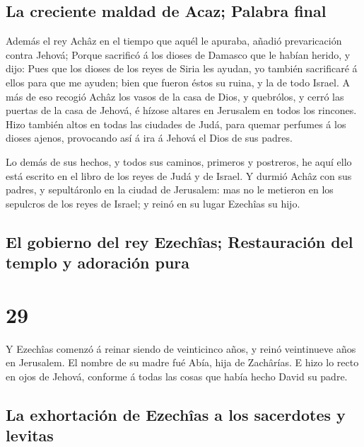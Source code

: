 \hypertarget{la-creciente-maldad-de-acaz-palabra-final}{%
\subsection{La creciente maldad de Acaz; Palabra
final}\label{la-creciente-maldad-de-acaz-palabra-final}}

 Además el rey Achâz en el tiempo que aquél le apuraba,
añadió prevaricación contra Jehová;  Porque sacrificó á los
dioses de Damasco que le habían herido, y dijo: Pues que los dioses de
los reyes de Siria les ayudan, yo también sacrificaré á ellos para que
me ayuden; bien que fueron éstos su ruina, y la de todo Israel.
 A más de eso recogió Achâz los vasos de la casa de Dios, y
quebrólos, y cerró las puertas de la casa de Jehová, é hízose altares en
Jerusalem en todos los rincones.  Hizo también altos en
todas las ciudades de Judá, para quemar perfumes á los dioses ajenos,
provocando así á ira á Jehová el Dios de sus padres.

 Lo demás de sus hechos, y todos sus caminos, primeros y
postreros, he aquí ello está escrito en el libro de los reyes de Judá y
de Israel.  Y durmió Achâz con sus padres, y sepultáronlo
en la ciudad de Jerusalem: mas no le metieron en los sepulcros de los
reyes de Israel; y reinó en su lugar Ezechîas su hijo.

\hypertarget{el-gobierno-del-rey-ezechuxeeas-restauraciuxf3n-del-templo-y-adoraciuxf3n-pura}{%
\subsection{El gobierno del rey Ezechîas; Restauración del templo y
adoración
pura}\label{el-gobierno-del-rey-ezechuxeeas-restauraciuxf3n-del-templo-y-adoraciuxf3n-pura}}

\hypertarget{section-28}{%
\section{29}\label{section-28}}

 Y Ezechîas comenzó á reinar siendo de veinticinco años, y
reinó veintinueve años en Jerusalem. El nombre de su madre fué Abía,
hija de Zachârías.  E hizo lo recto en ojos de Jehová,
conforme á todas las cosas que había hecho David su padre.

\hypertarget{la-exhortaciuxf3n-de-ezechuxeeas-a-los-sacerdotes-y-levitas}{%
\subsection{La exhortación de Ezechîas a los sacerdotes y
levitas}\label{la-exhortaciuxf3n-de-ezechuxeeas-a-los-sacerdotes-y-levitas}}

